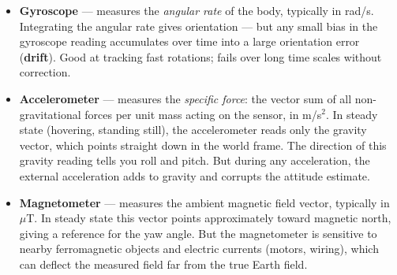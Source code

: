 \documentclass[12pt, a4paper]{article}
\begin{document}
\begin{itemize}[leftmargin=1.4em, itemsep=4pt]
  \item \textbf{Gyroscope} --- measures the \emph{angular rate} of the body,
    typically in rad/s.
    Integrating the angular rate gives orientation --- but any small bias in
    the gyroscope reading accumulates over time into a large orientation error
    (\textbf{drift}).
    Good at tracking fast rotations; fails over long time scales without
    correction.

  \item \textbf{Accelerometer} --- measures the \emph{specific force}: the
    vector sum of all non-gravitational forces per unit mass acting on the
    sensor, in m/s$^2$.
    In steady state (hovering, standing still), the accelerometer reads only
    the gravity vector, which points straight down in the world frame.
    The direction of this gravity reading tells you roll and pitch.
    But during any acceleration, the external acceleration adds to gravity
    and corrupts the attitude estimate.

  \item \textbf{Magnetometer} --- measures the ambient magnetic field vector,
    typically in $\mu$T.
    In steady state this vector points approximately toward magnetic north,
    giving a reference for the yaw angle.
    But the magnetometer is sensitive to nearby ferromagnetic objects and
    electric currents (motors, wiring), which can deflect the measured field
    far from the true Earth field.
\end{itemize}
\end{document}
